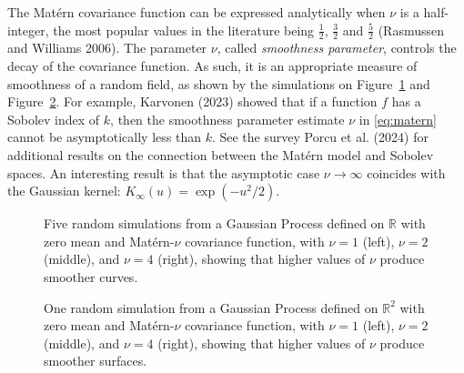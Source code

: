 \documentclass[
  12pt,
]{interact}
\theoremstyle{plain}
\begin{document}
The Matérn covariance function can be expressed analytically when
\(\nu\) is a half-integer, the most popular values in the literature
being \(\frac{1}{2}\), \(\frac{3}{2}\) and \(\frac{5}{2}\) (Rasmussen
and Williams 2006). The parameter \(\nu\), called \emph{smoothness
parameter}, controls the decay of the covariance function. As such, it
is an appropriate measure of smoothness of a random field, as shown by
the simulations on Figure~\ref{fig-matern-1d} and
Figure~\ref{fig-matern-2d}. For example, Karvonen (2023) showed that if
a function \(f\) has a Sobolev index of \(k\), then the smoothness
parameter estimate \(\nu\) in \eqref{eq:matern} cannot be asymptotically
less than \(k\). See the survey Porcu et al. (2024) for additional
results on the connection between the Matérn model and Sobolev spaces.
An interesting result is that the asymptotic case
\(\nu\rightarrow\infty\) coincides with the Gaussian kernel:
\(K_\infty(u)=\exp(-u^{2}/2)\).

\begin{figure}


\caption{\label{fig-matern-1d}Five random simulations from a Gaussian
Process defined on \(\mathbb{R}\) with zero mean and Matérn-\(\nu\)
covariance function, with \(\nu=1\) (left), \(\nu=2\) (middle), and
\(\nu=4\) (right), showing that higher values of \(\nu\) produce
smoother curves.}

\end{figure}%

\begin{figure}


\caption{\label{fig-matern-2d}One random simulation from a Gaussian
Process defined on \(\mathbb{R}^2\) with zero mean and Matérn-\(\nu\)
covariance function, with \(\nu=1\) (left), \(\nu=2\) (middle), and
\(\nu=4\) (right), showing that higher values of \(\nu\) produce
smoother surfaces.}

\end{figure}%
\end{document}
